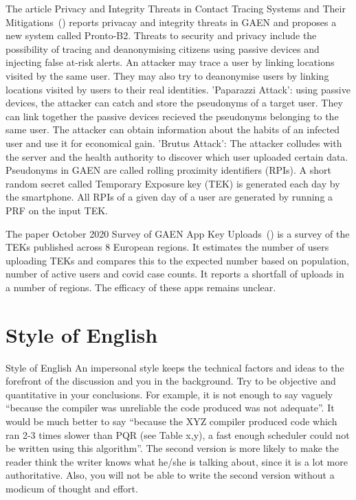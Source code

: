 The article Privacy and Integrity Threats in Contact
Tracing Systems and Their Mitigations~(\cite{9928557}) reports privacay and integrity threats in GAEN and proposes a new system called Pronto-B2. Threats to security and privacy include the possibility of tracing and deanonymising citizens using passive devices and injecting false at-risk alerts. An attacker may trace a user by linking locations visited by the same user. They may also try to deanonymise users by linking locations visited by users to their real identities. 'Paparazzi Attack': using passive devices, the attacker can catch and store the pseudonyms of a target user. They can link together the passive devices recieved the pseudonyms belonging to the same user. The attacker can obtain information about the habits of an infected user and use it for economical gain. 'Brutus Attack': The attacker colludes with the server and the health authority to discover which user uploaded certain data. Pseudonyms in GAEN are called rolling proximity identifiers (RPIs). A short random secret called Temporary Exposure key (TEK) is generated each day by the smartphone. All RPIs of a given day of a user are generated by running a PRF on the input TEK.

The paper October 2020 Survey of GAEN App Key Uploads~(\cite{survey}) is a survey of the TEKs published across 8 European regions. It estimates the number of users uploading TEKs and compares this to the expected number based on population, number of active users and covid case counts. It reports a shortfall of uploads in a number of regions. The efficacy of these apps remains unclear.

\section{Style of English}
\label{sec:StyleOfEnglish}

Style of English
An impersonal style keeps the technical factors and ideas to the forefront of the discussion and you in the background. Try to be objective and quantitative in your conclusions. For example, it is not enough to say vaguely “because the compiler was unreliable the code produced was not adequate”. It would be much better to say “because the XYZ compiler produced code which ran 2-3 times slower than PQR (see Table x,y), a fast enough scheduler could not be written using this algorithm”. The second version is more likely to make the reader think the writer knows what he/she is talking about, since it is a lot more authoritative. Also, you will not be able to write the second version without a modicum of thought and effort.

